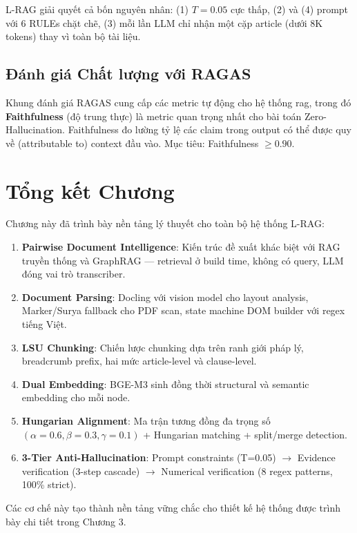 L-RAG giải quyết cả bốn nguyên nhân: (1) $T = 0.05$ cực thấp, (2) và (4) prompt với 6 RULEs chặt chẽ, (3) mỗi lần LLM chỉ nhận một cặp article (dưới 8K tokens) thay vì toàn bộ tài liệu.

\subsection{Đánh giá Chất lượng với RAGAS}

Khung đánh giá RAGAS \cite{es2024ragas} cung cấp các metric tự động cho hệ thống \gls{rag}, trong đó \textbf{Faithfulness} (độ trung thực) là metric quan trọng nhất cho bài toán Zero-Hallucination. Faithfulness đo lường tỷ lệ các claim trong output có thể được quy về (attributable to) context đầu vào. Mục tiêu: Faithfulness $\geq 0.90$.

\section{Tổng kết Chương}

Chương này đã trình bày nền tảng lý thuyết cho toàn bộ hệ thống L-RAG:

\begin{enumerate}[label=(\arabic*)]
    \item \textbf{Pairwise Document Intelligence}: Kiến trúc đề xuất khác biệt với RAG truyền thống và GraphRAG — retrieval ở build time, không có query, LLM đóng vai trò transcriber.
    \item \textbf{Document Parsing}: Docling với vision model cho layout analysis, Marker/Surya fallback cho PDF scan, state machine DOM builder với regex tiếng Việt.
    \item \textbf{LSU Chunking}: Chiến lược chunking dựa trên ranh giới pháp lý, breadcrumb prefix, hai mức article-level và clause-level.
    \item \textbf{Dual Embedding}: BGE-M3 sinh đồng thời structural và semantic embedding cho mỗi node.
    \item \textbf{Hungarian Alignment}: Ma trận tương đồng đa trọng số $(\alpha=0.6, \beta=0.3, \gamma=0.1)$ + Hungarian matching + split/merge detection.
    \item \textbf{3-Tier Anti-Hallucination}: Prompt constraints (T=0.05) $\rightarrow$ Evidence verification (3-step cascade) $\rightarrow$ Numerical verification (8 regex patterns, 100\% strict).
\end{enumerate}

Các cơ chế này tạo thành nền tảng vững chắc cho thiết kế hệ thống được trình bày chi tiết trong Chương 3.
